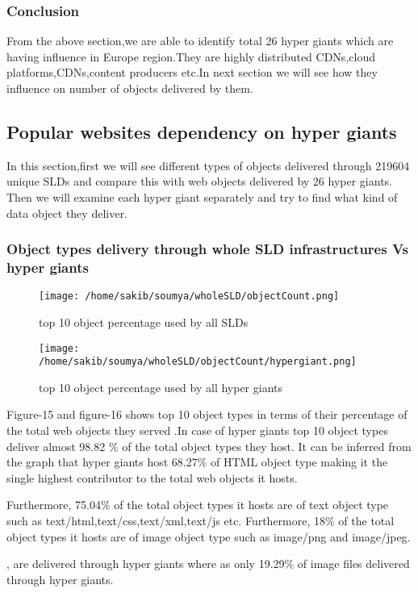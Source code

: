 \pagebreak
\subsubsection{Conclusion}
From the above section,we are able to identify total 26 hyper giants which are having influence in Europe region.They are highly distributed CDNs,cloud platforms,CDNs,content producers etc.In next section we will see how they influence on number of objects delivered by them.

\subsection{Popular websites dependency on hyper giants}
In this section,first we will see different types of objects delivered through 219604 unique SLDs and compare this with web objects delivered by 26 hyper giants. Then we will examine each hyper giant separately and try to find what kind of data object they deliver. 
\subsubsection{Object types delivery through whole SLD infrastructures Vs hyper giants}
\begin{figure}[h]
\texttt{[image: /home/sakib/soumya/wholeSLD/objectCount.png]}
\centering
\caption{top 10 object percentage used by all SLDs}
\end{figure}
\begin{figure}[h]
\texttt{[image: /home/sakib/soumya/wholeSLD/objectCount/hypergiant.png]}
\centering
\caption{top 10 object percentage used by all hyper giants}
\end{figure}

Figure-15 and figure-16 shows top 10 object types in terms of their percentage of the total web objects they served .In case of hyper giants top 10 object types deliver almost 98.82 \% of the total object types they host. It can be inferred from the graph that hyper giants host 68.27\% of HTML object type making it the single highest contributor to the total web objects it hosts. 


Furthermore, 75.04\% of the total object types it hosts are of text object type such as text/html,text/css,text/xml,text/js etc. Furthermore, 18\% of the total object types it hosts are of image object type such as image/png and image/jpeg. 

, are delivered through hyper giants where as only 19.29\% of image files delivered through hyper giants.




